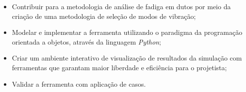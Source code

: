 \begin{itemize}
    \item Contribuir para a metodologia de análise de fadiga em dutos por meio da criação de uma metodologia de seleção de modos de vibração;
    \item Modelar e implementar a ferramenta utilizando o paradigma da programação orientada a objetos, através da linguagem \textit{Python};
    \item Criar um ambiente interativo de visualização de resultados da simulação com ferramentas que garantam maior liberdade e eficiência para o projetista;
    \item Validar a ferramenta com aplicação de casos.
\end{itemize}

% 
